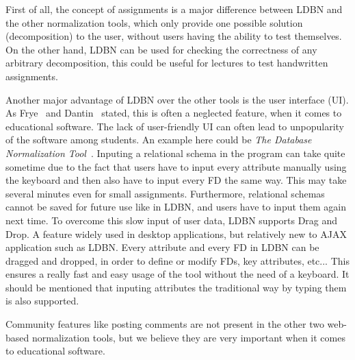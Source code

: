 First of all, the concept of assignments is a major
difference between LDBN and the other normalization tools, 
which only provide 
one possible solution (decomposition) to the user, without users having the ability to test 
themselves. On the other hand, LDBN can be used for checking the correctness of any
arbitrary decomposition, this could be useful for lectures to test handwritten assignments. 

Another major advantage of LDBN over the other tools is the user interface (UI). 
As Frye~\cite{p10} and Dantin~\cite{p9} stated, this is often a
neglected feature, when it comes to educational software. The lack of user-friendly UI 
can often lead to unpopularity of the software among students. An example here could be 
\textit{The Database Normalization Tool}~\cite{w1}. Inputing a relational schema in the program can
take quite sometime due to the fact that
users have to input every attribute manually using the keyboard and then also 
have to input every FD the same way. This may take several minutes even for small  
assignments. Furthermore, relational schemas cannot be saved for future use like 
in LDBN, and users have to input them again next time. To overcome this slow input of user data, 
LDBN supports Drag and Drop. A feature widely used in desktop
applications, but relatively new to AJAX application such as LDBN. Every attribute
and every FD in LDBN can be dragged and dropped, in order 
to define or modify FDs, key attributes, etc... This ensures a really fast and easy
usage of the tool without the need of a keyboard. It should be mentioned
that inputing attributes the traditional way by typing them is also supported.

Community features like posting comments are not present in the other two web-based 
normalization tools, but we believe they are very important when it comes to educational
software. 

